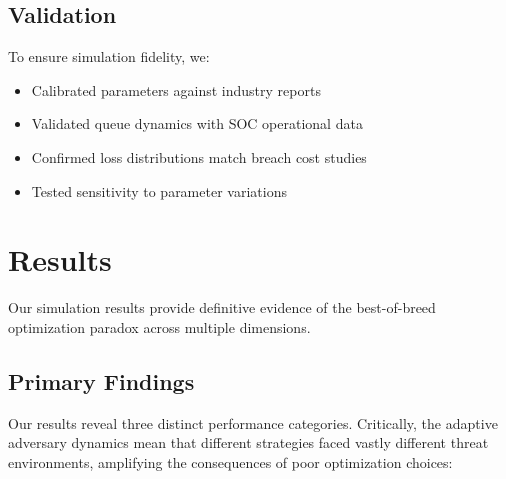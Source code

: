 \documentclass[10pt,conference]{IEEEtran}
\begin{document}
\subsection{Validation}

To ensure simulation fidelity, we:
\begin{itemize}
\item Calibrated parameters against industry reports \cite{verizon2024dbir}
\item Validated queue dynamics with SOC operational data
\item Confirmed loss distributions match breach cost studies
\item Tested sensitivity to parameter variations
\end{itemize}

\section{Results}

Our simulation results provide definitive evidence of the best-of-breed optimization paradox across multiple dimensions.

\subsection{Primary Findings}

Our results reveal three distinct performance categories. Critically, the adaptive adversary dynamics mean that different strategies faced vastly different threat environments, amplifying the consequences of poor optimization choices:
\end{document}
